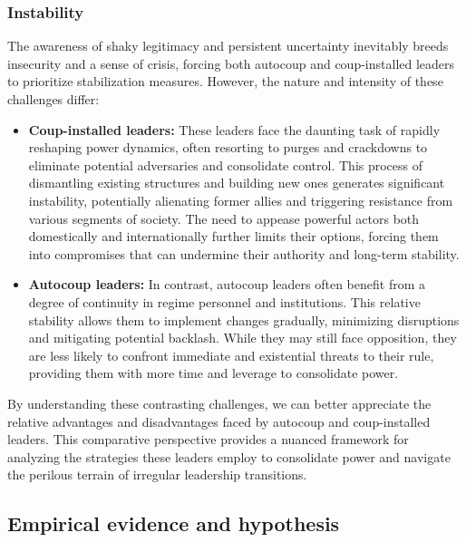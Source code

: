 \documentclass[
  12pt,
]{report}
\begin{document}
\subsubsection*{Instability}\label{instability}

The awareness of shaky legitimacy and persistent uncertainty inevitably
breeds insecurity and a sense of crisis, forcing both autocoup and
coup-installed leaders to prioritize stabilization measures. However,
the nature and intensity of these challenges differ:

\begin{itemize}
\item
  \textbf{Coup-installed leaders:} These leaders face the daunting task
  of rapidly reshaping power dynamics, often resorting to purges and
  crackdowns to eliminate potential adversaries and consolidate control.
  This process of dismantling existing structures and building new ones
  generates significant instability, potentially alienating former
  allies and triggering resistance from various segments of society. The
  need to appease powerful actors both domestically and internationally
  further limits their options, forcing them into compromises that can
  undermine their authority and long-term stability.
\item
  \textbf{Autocoup leaders:} In contrast, autocoup leaders often benefit
  from a degree of continuity in regime personnel and institutions. This
  relative stability allows them to implement changes gradually,
  minimizing disruptions and mitigating potential backlash. While they
  may still face opposition, they are less likely to confront immediate
  and existential threats to their rule, providing them with more time
  and leverage to consolidate power.
\end{itemize}

By understanding these contrasting challenges, we can better appreciate
the relative advantages and disadvantages faced by autocoup and
coup-installed leaders. This comparative perspective provides a nuanced
framework for analyzing the strategies these leaders employ to
consolidate power and navigate the perilous terrain of irregular
leadership transitions.

\subsection{Empirical evidence and
hypothesis}\label{empirical-evidence-and-hypothesis}
\end{document}

